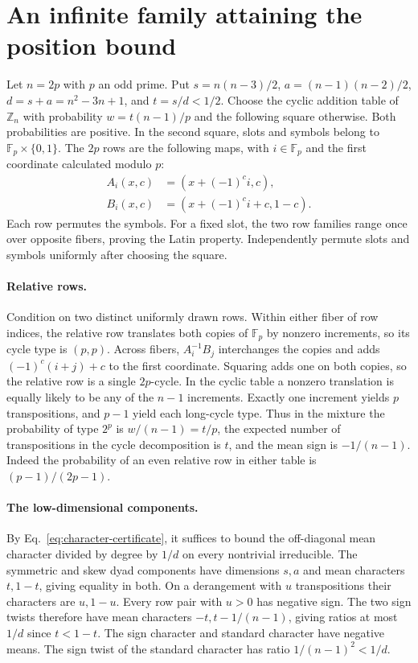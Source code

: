 \section{An infinite family attaining the position bound}
\label{app:two-prime}
Let $n=2p$ with $p$ an odd prime. Put $s=n(n-3)/2$,
$a=(n-1)(n-2)/2$, $d=s+a=n^2-3n+1$, and $t=s/d<1/2$.
Choose the cyclic addition table of $\mathbb Z_n$ with probability
$w=t(n-1)/p$ and the following square otherwise. Both probabilities are positive.
In the second square, slots and symbols belong to $\mathbb F_p\times\{0,1\}$.
The $2p$ rows are the following maps, with $i\in\mathbb F_p$ and
the first coordinate calculated modulo $p$:
\[
\begin{aligned}
 A_i(x,c)&=(x+(-1)^c i,c),\\
 B_i(x,c)&=(x+(-1)^c i+c,1-c).
\end{aligned}
\]
Each row permutes the symbols. For a fixed slot, the two row families
range once over opposite fibers, proving the Latin property. Independently
permute slots and symbols uniformly after choosing the square.

\paragraph{Relative rows.}
Condition on two distinct uniformly drawn rows. Within either fiber
of row indices, the relative row translates both copies of $\mathbb F_p$
by nonzero increments, so its cycle type is $(p,p)$.
Across fibers, $A_i^{-1}B_j$ interchanges the copies and adds
$(-1)^c(i+j)+c$ to the first coordinate. Squaring adds one on both
copies, so the relative row is a single $2p$-cycle. In the cyclic
table a nonzero translation is equally likely to be any of the
$n-1$ increments. Exactly one increment yields $p$ transpositions,
and $p-1$ yield each long-cycle type. Thus in the mixture the probability
of type $2^p$ is $w/(n-1)=t/p$, the expected number of transpositions
in the cycle decomposition is $t$, and the mean sign is $-1/(n-1)$.
Indeed the probability of an even relative row in either table is
$(p-1)/(2p-1)$.

\paragraph{The low-dimensional components.}
By Eq.~\eqref{eq:character-certificate}, it suffices to bound the
off-diagonal mean character divided by degree by $1/d$ on every
nontrivial irreducible. The symmetric and skew dyad components have
dimensions $s,a$ and mean characters $t,1-t$, giving equality in
both. On a derangement with $u$ transpositions their characters are
$u,1-u$. Every row pair with $u>0$ has negative sign. The two
sign twists therefore have mean characters $-t,t-1/(n-1)$, giving
ratios at most $1/d$ since $t<1-t$. The sign character and standard
character have negative means. The sign twist of the standard character
has ratio $1/(n-1)^2<1/d$.

